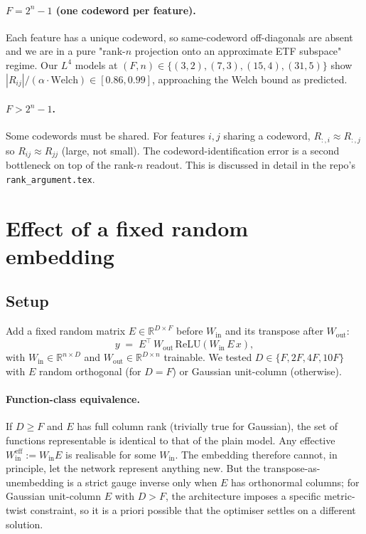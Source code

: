 \documentclass[11pt]{article}
\newcommand{\Wein}{W_{\mathrm{in}}}
\newcommand{\Weout}{W_{\mathrm{out}}}
\begin{document}
\paragraph{$F = 2^n - 1$ (one codeword per feature).} Each feature has a
unique codeword, so same-codeword off-diagonals are absent and we are in a
pure "rank-$n$ projection onto an approximate ETF subspace" regime. Our
$L^4$ models at $(F,n) \in \{(3,2), (7,3), (15,4), (31,5)\}$ show
$|R_{ij}|/(\alpha\cdot\mathrm{Welch}) \in [0.86, 0.99]$, approaching the
Welch bound as predicted.

\paragraph{$F > 2^n - 1$.} Some codewords must be shared. For features $i,j$
sharing a codeword, $R_{:,i} \approx R_{:,j}$ so $R_{ij} \approx R_{jj}$
(large, not small). The codeword-identification error is a second bottleneck
on top of the rank-$n$ readout. This is discussed in detail in the repo's
\texttt{rank\_argument.tex}.

\section{Effect of a fixed random embedding}

\subsection{Setup}

Add a fixed random matrix $E \in \mathbb{R}^{D \times F}$ before $\Wein$ and
its transpose after $\Weout$:
\begin{equation*}
y \;=\; E^\top\,\Weout\,\mathrm{ReLU}(\Wein\,E\,x),
\end{equation*}
with $\Wein \in \mathbb{R}^{n \times D}$ and $\Weout \in \mathbb{R}^{D \times n}$
trainable. We tested $D \in \{F, 2F, 4F, 10F\}$ with $E$ random orthogonal (for
$D=F$) or Gaussian unit-column (otherwise).

\paragraph{Function-class equivalence.} If $D \ge F$ and $E$ has full column
rank (trivially true for Gaussian), the set of functions representable is
identical to that of the plain model. Any effective
$\Wein^{\mathrm{eff}} := \Wein E$ is realisable for some $\Wein$. The
embedding therefore cannot, in principle, let the network represent anything
new. But the transpose-as-unembedding is a strict gauge inverse only when $E$
has orthonormal columns; for Gaussian unit-column $E$ with $D > F$, the
architecture imposes a specific metric-twist constraint, so it is a priori
possible that the optimiser settles on a different solution.
\end{document}
